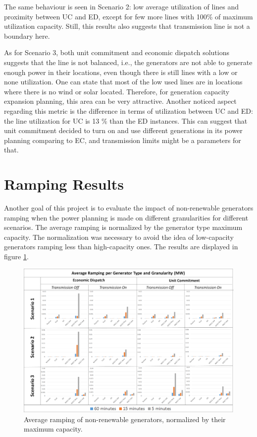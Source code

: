 \documentclass[12pt,LUDisStyle,twosided]{book}
\begin{document}
The same behaviour is seen in Scenario 2: low average utilization of lines and proximity between UC and ED, except for few more lines with 100\% of maximum utilization capacity. Still, this results also suggests that transmission line is not a boundary here.

As for Scenario 3, both unit commitment and economic dispatch solutions suggests that the line is not balanced, i.e., the generators are not able to generate enough power in their locations, even though there is still lines with a low or none utilization. One can state that most of the low used lines are in locations where there is no wind or solar located. Therefore, for generation capacity expansion planning, this area can be very attractive. Another noticed aspect regarding this metric is the difference in terms of utilization between UC and ED: the line utilization for UC is 13 \% than the ED instances. This can suggest that unit commitment decided to turn on and use different generations in its power planning comparing to EC, and transmission limits might be a parameters for that.



\section{Ramping Results} \label{section:ramping}

Another goal of this project is to evaluate the impact of non-renewable generators ramping when the power planning is made on different granularities for different scenarios. The average ramping is normalized by the generator type maximum capacity. The normalization was necessary to avoid the idea of low-capacity generators ramping less than high-capacity ones. The results are displayed in figure  \ref{fig:averageramping}.

\begin{figure}[H] 
  \centering
  
	  \includegraphics[width=\textwidth,height=\textheight,keepaspectratio]{averageRamping.png}
  
  \caption{Average ramping of non-renewable generators, normalized by their maximum capacity.}
  \label{fig:averageramping}
    
\end{figure}
\end{document}
